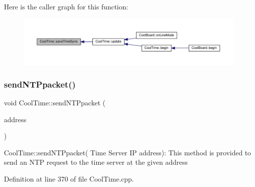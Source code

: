 Here is the caller graph for this function\+:\nopagebreak
\begin{figure}[H]
\begin{center}
\leavevmode
\includegraphics[width=350pt]{d6/d49/class_cool_time_ae9658c9b377510d469e3b88edf33ee85_icgraph}
\end{center}
\end{figure}
\mbox{\label{class_cool_time_a236a38d120dc53bc67456d763838c5a1}} 
\subsubsection{\texorpdfstring{send\+N\+T\+Ppacket()}{sendNTPpacket()}}
{\footnotesize\ttfamily void Cool\+Time\+::send\+N\+T\+Ppacket (\begin{DoxyParamCaption}\item[{I\+P\+Address \&}]{address }\end{DoxyParamCaption})}

Cool\+Time\+::send\+N\+T\+Ppacket( Time Server I\+P address)\+: This method is provided to send an N\+TP request to the time server at the given address 

Definition at line 370 of file Cool\+Time.\+cpp.


